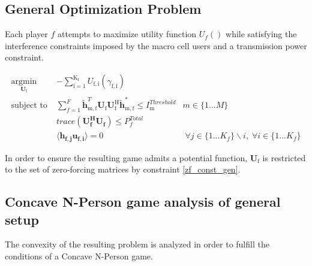\documentclass[12pt,a4paper]{report}
\begin{document}
\subsection{General Optimization Problem}

Each player $f$ attempts to maximize utility function $U_f()$ while satisfying the interference constraints imposed by the macro cell users and a transmission power constraint. 
\par




	\begin{subequations}
	\label{optim}
	\begin{align}
	    \underset{\mathbf{U}_{\mathrm{f}} }{\text{argmin}} \;
	    & - \sum_{\mathrm{i=1}}^{\mathrm{K_f}}
    	U_{\mathrm{f,i}}(\gamma_{\mathrm{f,i}}) \label{player_opt} \\
	    \text{subject to} \; &
	   \sum^F_{f=1} \mathbf{\tilde{h}}_{\mathrm{m,f}}^T  \mathbf{U_{\mathrm{f}}}		
	\mathbf{U_{\mathrm{f}}^{\mathrm{H}}} \mathbf{\tilde{h}_{\mathrm{m,f}}^*} \leq I^{Threshold}		
	_{\mathrm{m}} & m \in \{1 ...M\} 
		\label{interference_const_gen}\\
        & trace(\mathbf{U_f^H}\mathbf{U_f}) \leq P^{Total}_{f} \label{power_const_gen}\\
        & \langle \mathbf{h_{f,j}}\mathbf{u_{f,i}} \rangle =0\ & \; \forall j \in \{1... K_f\}\backslash i ,\; \forall i \in \{1 ... K_f\} \label{zf_const_gen}
	\end{align}
	\end{subequations}
	
In order to ensure the resulting game admits a potential function, $\mathbf{U}_{\mathrm{f}}$ is restricted to the set of zero-forcing matrices by constraint \eqref{zf_const_gen}.	
	
\subsection{Concave N-Person game analysis of general setup}
The convexity of the resulting problem is analyzed in order to fulfill the conditions of a Concave N-Person game. 
\end{document}
